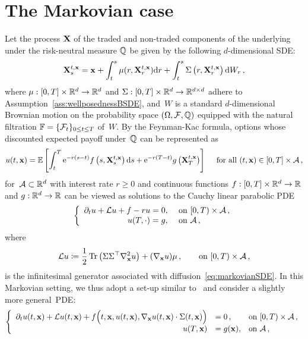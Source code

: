 \section{The Markovian case}\label{sec:markovian_case}
Let the process $\mathbf{X}$ of the traded and non-traded components of the underlying under the risk-neutral measure $\mathbb{Q}$ be given by the following $d$-dimensional SDE:
\begin{equation}\label{eq:markovianSDE}
\mathbf{X}_s^{t,\mathbf{x}} = \mathbf{x} + \int_t^s \mu(r, \mathbf{X}_r^{t,\mathbf{x}})\mathrm{d} r
+ \int_t^s \Sigma\left(r, \mathbf{X}_r^{t,\mathbf{x}}\right)\mathrm{d} W_r\,,
\end{equation}
where $\mu: [0, T]\times\mathbb{R}^d\rightarrow\mathbb{R}^d$
and $\Sigma:[0, T]\times\mathbb{R}^d\rightarrow\mathbb{R}^{d\times d}$ adhere to Assumption~\ref{ass:wellposednessBSDE}, 
and~$W$ is a standard $d$-dimensional Brownian motion on the probability space $(\Omega, \mathcal{F}, \mathbb{Q})$ equipped
with the natural filtration $\mathbb{F} = \{\mathcal{F}_t\}_{0\leq t\leq T}$ of~$W$. 
By the Feynman-Kac formula, options whose discounted expected payoff under~$\mathbb{Q}$ can be represented as
\begin{equation}
    u(t, \mathbf{x})=\mathbb{E}\left[\int_t^T \mathrm{e}^{-r(s-t)} f\left(s, \mathbf{X}_s^{t, \mathbf{x}}\right) \mathrm{d} s + \mathrm{e}^{-r(T-t)} g\left(\mathbf{X}_T^{t, \mathbf{x}}\right)\right]\quad \textup{ for all } (t, \mathbf{x}) \in[0, T] \times \mathcal{A}\,,
\end{equation}
for~$\mathcal{A}\subset\mathbb{R}^d$ with interest rate $r\geq 0$ and continuous functions $f:[0,T]\times\mathbb{R}^d\to\mathbb{R}$
and $g:\mathbb{R}^d\to\mathbb{R}$ can be viewed as solutions to the Cauchy linear parabolic PDE
\begin{equation*}
\left\{
\begin{array}{rl}
\partial_t u + \mathcal{L} u + f - ru= 0, & \text { on }[0, T) \times \mathcal{A}\,, \\
u(T, \cdot)= g, & \text { on } \mathcal{A}\,,
\end{array}
\right.
\end{equation*}
where
\begin{align}\label{eq:infinitesimal_generator}
\mathcal{L} u \coloneqq \frac{1}{2}\operatorname{Tr}
\left(\Sigma\Sigma^\top \nabla_{\mathbf{x}}^2 u\right) +  (\nabla_{\mathbf{x}} u)\mu\,,
\qquad\text{on }[0,T)\times \mathcal{A}\,,
\end{align}
is the infinitesimal generator associated with diffusion~\eqref{eq:markovianSDE}.
In this Markovian setting, we thus adopt a set-up similar to~\cite{Hure2020DeepPDEs} and consider a slightly more general~PDE:
\begin{equation}\label{eq:markovianPDE}
\left\{
\begin{array}{rll}
    \partial_t u(t,\mathbf{x}) + \mathcal{L} u(t,\mathbf{x}) + 
    f\Big(t, \mathbf{x}, u(t,\mathbf{x}), \nabla_{\mathbf{x}} u(t,\mathbf{x}) \cdot \Sigma(t,\mathbf{x})\Big) &= 0\,, & \text{on }[0, T) \times \mathcal{A}\,,\\
     u(T, \mathbf{x}) &= g(\mathbf{x}), & \text{on }\mathcal{A}\,,
\end{array}
\right.
\end{equation}
